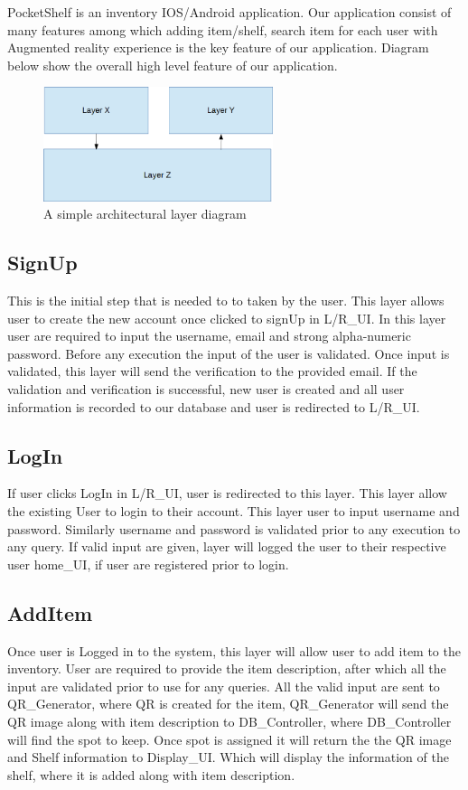 PocketShelf is an inventory IOS/Android application. Our application consist of many features among which adding item/shelf, search item for each user with Augmented reality experience is the key feature of our application. Diagram below show the overall high level feature of our application.


\begin{figure}[h!]
	\centering
 	\includegraphics[width=0.60\textwidth]{images/layers}
 \caption{A simple architectural layer diagram}
\end{figure}

\subsection{SignUp}
This is the initial step that is needed to to taken by the user. This layer allows user to create the new account once clicked to signUp in L/R\_UI. In this layer user are required to input the username, email and strong alpha-numeric password. Before any execution the input of the user is validated. Once input is validated, this layer will send the verification to the provided email. If the validation and verification is successful, new user is created and all user information is recorded to our database and user is redirected to L/R\_UI.

\subsection{LogIn}
If user clicks LogIn in L/R\_UI, user is redirected to this layer. This layer allow the existing User to login to their account. This layer user to input username and password. Similarly username and password is validated prior to any execution to any query. If valid input are given, layer will logged the user to their respective user home\_UI, if user are registered prior to login.

\subsection{AddItem}
Once user is Logged in to the system, this layer will allow user to add item to the inventory. User are required to provide the item description, after which all the input are validated prior to use for any queries. All the valid input are sent to QR\_Generator, where QR is created for the item, QR\_Generator will send the QR image along with item description to DB\_Controller, where DB\_Controller will find the spot to keep. Once spot is assigned it will return the the QR image and Shelf information to Display\_UI. Which will display the information of the shelf, where it is added along with item description. 


